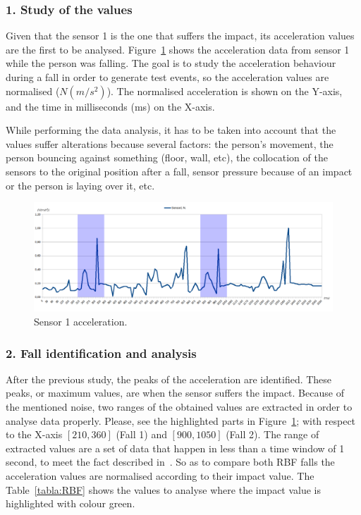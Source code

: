 \documentclass[journal]{IEEEtran}
\begin{document}
\subsubsection*{1. Study of the values} Given that the sensor 1 is the one that suffers the
impact, its acceleration values are the first to be analysed. Figure~\ref{fig:Sensor1Sombras} 
shows the acceleration data from sensor 1 while the person was falling. The goal is to study 
the acceleration behaviour during a fall in order to generate test events, so the acceleration 
values are normalised ($N(m/s^2)$). The normalised acceleration is
shown on the Y-axis, and the 
time in milliseconds (ms) on the X-axis.

While performing the data analysis, it has to be taken into account that the values suffer 
alterations because several factors: the person's movement, the person bouncing against something 
(floor, wall, etc), the collocation of the sensors to the original position after a fall, 
sensor pressure because of an impact or the person is laying over it, etc.

 \begin{figure}[!ht]
  \includegraphics[scale=0.19]{img/Sensor1Sombras}
  \caption[Sensor 1 acceleration]{Sensor 1 acceleration.}
  \label{fig:Sensor1Sombras}
\end{figure}

\subsubsection*{2. Fall identification and analysis} After the previous study, the peaks of the acceleration are identified. 
These peaks, or maximum values, are when the sensor suffers the
impact. Because of the mentioned noise, two ranges of the obtained 
values are extracted in order to analyse data properly. Please, see the highlighted parts in Figure~\ref{fig:Sensor1Sombras};
with respect to the X-axis $[210, 360]$ (Fall 1) and $[900, 1050]$ (Fall 2). The range of extracted values are a set of data that 
happen in less than a time window of 1 second, to meet the fact described in~\cite{Luder2009}. So as to compare both RBF falls
the acceleration values are normalised according to their impact value. The Table~\ref{tabla:RBF} 
shows the values to analyse where the impact value is highlighted with colour green.
\end{document}
